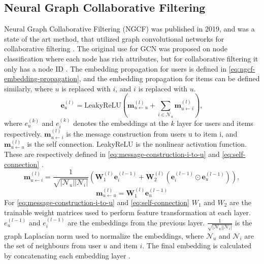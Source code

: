 \subsection{Neural Graph Collaborative Filtering}
Neural Graph Collaborative Filtering (NGCF) was published in 2019, and was a state of the art method, that utilized graph convolutional networks for collaborative filtering \cite{NGCF_2019}.
The original use for GCN was proposed on node classification where each node has rich attributes, but for collaborative filtering it only has a node ID \cite{kipf2017semisupervised,lightgcn,NGCF_2019}.
The embedding propagation for users is defined in \autoref{eq:ngcf-embedding-propagation}, and the embedding propagation for items can be defined similarly, where $u$ is replaced with $i$, and $i$ is replaced with $u$. \cite{NGCF_2019} %
\begin{equation}
    \mathbf{e}_{u}^{(l)} = \mbox{LeakyReLU}(\mathbf{m}^{(l)}_{u \leftarrow u} + \sum^{}_{i \in \mathcal{N}_u} \mathbf{m}^{(l)}_{u \leftarrow i}),
    \label{eq:ngcf-embedding-propagation}
\end{equation}
where $e_u^{(k)}$ and $e_i^{(k)}$ denotes the embeddings at the $k$ layer for users and items respectively.
$\mathbf{m}^{(l)}_{u \leftarrow i}$ is the message construction from users u to item i, and $\mathbf{m}^{(l)}_{u \leftarrow u}$ is the self connection.
LeakyReLU is the nonlinear activation function.
These are respectively defined in \autoref{eq:message-construction-i-to-u} and \autoref{eq:self-connection} \cite{NGCF_2019}.
\begin{equation}
    \mathbf{m}^{(l)}_{u \leftarrow i} = \frac{1}{\sqrt{|\mathcal{N}_u||\mathcal{N}_i|}}(\mathbf{W}^{(l)}_1\mathbf{e}^{(l-1)}_i + \mathbf{W}^{(l)}_2(\mathbf{e}^{(l-1)}_i \odot \mathbf{e}^{(l-1)}_u)),
    \label{eq:message-construction-i-to-u}
\end{equation}
\begin{equation}
    \mathbf{m}^{(l)}_{u \leftarrow u} = \mathbf{W}_1^{(l)}\mathbf{e}_u^{(l-1)}
    \label{eq:self-connection}
\end{equation}
For \autoref{eq:message-construction-i-to-u} and \autoref{eq:self-connection} $W_1$ and $W_2$ are the trainable weight matrices used to perform feature transformation at each layer.
$e_u^{(l-1)}$ and $e_i^{(l-1)}$ are the embeddings from the previous layer.
$\frac{1}{\sqrt{|\mathcal{N}_u||\mathcal{N}_i|}}$ is the graph Laplacian norm used to normalize the embeddings, where $\mathcal{N}_u$ and $\mathcal{N}_i$ are the set of neighbours from user $u$ and item $i$.
The final embedding is calculated by concatenating each embedding layer \cite{NGCF_2019}.
